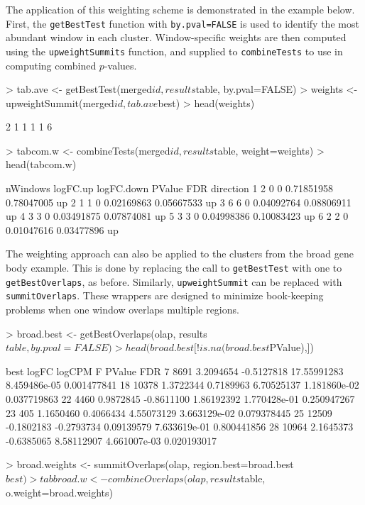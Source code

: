 \documentclass[12pt]{report}
\renewenvironment{Schunk}{\vspace{0pt}}{\vspace{0pt}}
\newcommand{\code}[1]{{\small\texttt{#1}}}
\begin{document}
The application of this weighting scheme is demonstrated in the example below.
First, the \code{getBestTest} function with \code{by.pval=FALSE} is used to identify the most abundant window in each cluster.
Window-specific weights are then computed using the \code{upweightSummits} function, and supplied to \code{combineTests} to use in computing combined $p$-values.

\begin{Schunk}
\begin{Sinput}
> tab.ave <- getBestTest(merged$id, results$table, by.pval=FALSE)
> weights <- upweightSummit(merged$id, tab.ave$best)
> head(weights)
\end{Sinput}
\begin{Soutput}
[1] 2 1 1 1 1 6
\end{Soutput}
\begin{Sinput}
> tabcom.w <- combineTests(merged$id, results$table, weight=weights)
> head(tabcom.w)
\end{Sinput}
\begin{Soutput}
  nWindows logFC.up logFC.down     PValue        FDR direction
1        2        0          0 0.71851958 0.78047005        up
2        1        1          0 0.02169863 0.05667533        up
3        6        6          0 0.04092764 0.08806911        up
4        3        3          0 0.03491875 0.07874081        up
5        3        3          0 0.04998386 0.10083423        up
6        2        2          0 0.01047616 0.03477896        up
\end{Soutput}
\end{Schunk}

The weighting approach can also be applied to the clusters from the broad gene body example.
This is done by replacing the call to \code{getBestTest} with one to \code{getBestOverlaps}, as before.
Similarly, \code{upweightSummit} can be replaced with \code{summitOverlaps}.
These wrappers are designed to minimize book-keeping problems when one window overlaps multiple regions.

\begin{Schunk}
\begin{Sinput}
> broad.best <- getBestOverlaps(olap, results$table, by.pval=FALSE)
> head(broad.best[!is.na(broad.best$PValue),])
\end{Sinput}
\begin{Soutput}
    best      logFC     logCPM           F       PValue         FDR
7   8691  3.2094654 -0.5127818 17.55991283 8.459486e-05 0.001477841
18 10378  1.3722344  0.7189963  6.70525137 1.181860e-02 0.037719863
22  4460  0.9872845 -0.8611100  1.86192392 1.770428e-01 0.250947267
23   405  1.1650460  0.4066434  4.55073129 3.663129e-02 0.079378445
25 12509 -0.1802183 -0.2793734  0.09139579 7.633619e-01 0.800441856
28 10964  2.1645373 -0.6385065  8.58112907 4.661007e-03 0.020193017
\end{Soutput}
\begin{Sinput}
> broad.weights <- summitOverlaps(olap, region.best=broad.best$best)
> tabbroad.w <- combineOverlaps(olap, results$table, o.weight=broad.weights) 
\end{Sinput}
\end{Schunk}
\end{document}
